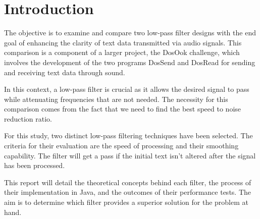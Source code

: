 \chapter{Introduction}

The objective is to examine and compare two low-pass filter designs with the end goal of enhancing the clarity of text data transmitted via audio signals. This comparison is a component of a larger project, the DosOok challenge, which involves the development of the two programs DosSend and DosRead for sending and receiving text data through sound.

In this context, a low-pass filter is crucial as it allows the desired signal to pass while attenuating frequencies that are not needed. The necessity for this comparison comes from the fact that we need to find the best speed to noise reduction ratio.

For this study, two distinct low-pass filtering techniques have been selected. The criteria for their evaluation are the speed of processing and their smoothing capability. The filter will get a pass if the initial text isn't altered after the signal has been processed.

This report will detail the theoretical concepts behind each filter, the process of their implementation in Java, and the outcomes of their performance tests. The aim is to determine which filter provides a superior solution for the problem at hand.
